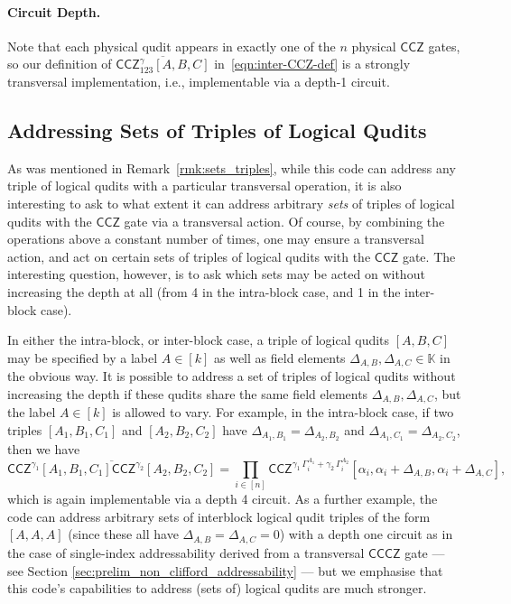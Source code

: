 \documentclass[11pt]{article}
\theoremstyle{definition}
\newcommand{\CCZ}{\mathsf{CCZ}}
\newcommand{\CCCZ}{\mathsf{CCCZ}}
\newcommand*{\ol}{\overline}
\begin{document}
\paragraph{Circuit Depth.} 
Note that each physical qudit appears in exactly one of the $n$ physical $\CCZ$ gates, so our definition of $\ol{\CCZ_{123}^\gamma[A,B,C]}$ in~\eqref{eqn:inter-CCZ-def} is a strongly transversal implementation, i.e., implementable via a depth-1 circuit. 


\subsection{Addressing Sets of Triples of Logical Qudits}\label{sec:sets_triples_CCZ}

As was mentioned in Remark~\ref{rmk:sets_triples}, while this code can address any triple of logical qudits with a particular transversal operation, it is also interesting to ask to what extent it can address arbitrary \textit{sets} of triples of logical qudits with the $\CCZ$ gate via a transversal action. Of course, by combining the operations above a constant number of times, one may ensure a transversal action, and act on certain sets of triples of logical qudits with the $\CCZ$ gate. The interesting question, however, is to ask which sets may be acted on without increasing the depth at all (from 4 in the intra-block case, and 1 in the inter-block case).

In either the intra-block, or inter-block case, a triple of logical qudits $[A,B,C]$ may be specified by a label $A \in [k]$ as well as field elements $\Delta_{A,B}, \Delta_{A,C} \in \mathbb{K}$ in the obvious way. It is possible to address a set of triples of logical qudits without increasing the depth if these qudits share the same field elements $\Delta_{A,B}, \Delta_{A,C}$, but the label $A \in [k]$ is allowed to vary. For example, in the intra-block case, if two triples $[A_1, B_1, C_1]$ and $[A_2, B_2, C_2]$ have $\Delta_{A_1, B_1} = \Delta_{A_2, B_2}$ and $\Delta_{A_1, C_1} = \Delta_{A_2, C_2}$, then we have
\begin{equation}
    \ol{\CCZ^{\gamma_1}[A_1,B_1,C_1]\CCZ^{\gamma_2}[A_2,B_2,C_2]} = \prod_{i \in [n]}\CCZ^{\gamma_1\,\Gamma_i^{A_1}+\gamma_2\,\Gamma_i^{A_2}}[\alpha_i, \alpha_i+\Delta_{A,B}, \alpha_i+\Delta_{A,C}],
\end{equation}
which is again implementable via a depth 4 circuit. As a further example, the code can address arbitrary sets of interblock logical qudit triples of the form $[A,A,A]$ (since these all have $\Delta_{A,B} = \Delta_{A,C} = 0$) with a depth one circuit as in the case of single-index addressability derived from a transversal $\CCCZ$ gate --- see Section \ref{sec:prelim_non_clifford_addressability} --- but we emphasise that this code's capabilities to address (sets of) logical qudits are much stronger.
\end{document}
